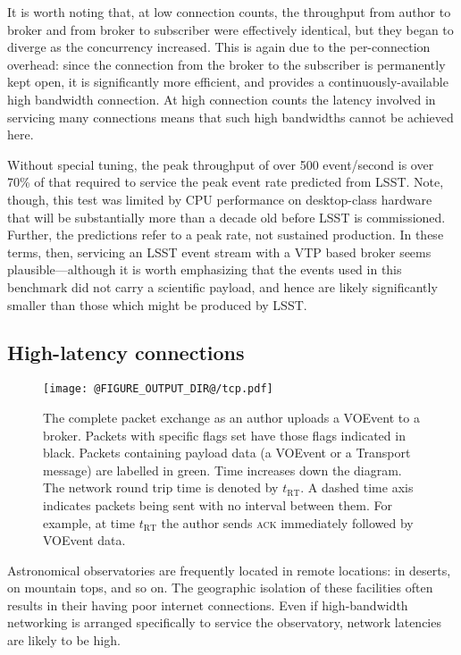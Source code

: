 \documentclass[5p,authoryear]{elsarticle}
\begin{document}
It is worth noting that, at low connection counts, the throughput from author
to broker and from broker to subscriber were effectively identical, but they
began to diverge as the concurrency increased. This is again due to the
per-connection overhead: since the connection from the broker to the
subscriber is permanently kept open, it is significantly more efficient, and
provides a continuously-available high bandwidth connection. At high
connection counts the latency involved in servicing many connections means
that such high bandwidths cannot be achieved here.

Without special tuning, the peak throughput of over 500 event/second is over
70\% of that required to service the peak event rate predicted from LSST.
Note, though, this test was limited by CPU performance on desktop-class
hardware that will be substantially more than a decade old before LSST is
commissioned. Further, the predictions refer to a peak rate, not sustained
production. In these terms, then, servicing an LSST event stream with a VTP
based broker seems plausible---although it is worth emphasizing that the
events used in this benchmark did not carry a scientific payload, and hence
are likely significantly smaller than those which might be produced by LSST.

\subsection{High-latency connections}
\label{sec:perf:highlatency}

\begin{figure}
  \begin{center}
  \texttt{[image: @FIGURE\_OUTPUT\_DIR@/tcp.pdf]}
  \end{center}

  \caption{The complete packet exchange as an author uploads a VOEvent to a
  broker. Packets with specific flags set have those flags indicated in black.
  Packets containing payload data (a VOEvent or a Transport message) are
  labelled in green.  Time increases down the diagram. The network round trip
  time is denoted by $t_\mathrm{RT}$. A dashed time axis indicates packets
  being sent with no interval between them. For example, at time
  $t_\mathrm{RT}$ the author sends \textsc{ack} immediately followed by
  VOEvent data.}

  \label{fig:tcp}
\end{figure}

Astronomical observatories are frequently located in remote locations: in
deserts, on mountain tops, and so on. The geographic isolation of these
facilities often results in their having poor internet connections. Even if
high-bandwidth networking is arranged specifically to service the observatory,
network latencies are likely to be high.
\end{document}
